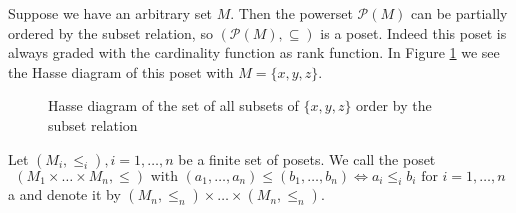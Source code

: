 \begin{exam}
	Suppose we have an arbitrary set $M$. Then the powerset $\mathcal P (M)$ can be partially ordered by the subset relation, so $(\mathcal P (M), \subseteq)$ is a poset. Indeed this poset is always graded with the cardinality function as rank function. In Figure \ref{fig:poset-xyz-subsets} we see the Hasse diagram of this poset with $M = \{x,y,z\}$.

	\begin{figure}[ht]
		\centering
		
		\caption{Hasse diagram of the set of all subsets of $\{x,y,z\}$ order by the subset relation}
		\label{fig:poset-xyz-subsets}
	\end{figure}
\end{exam}

\begin{defi}
	Let $(M_i, \leq_i), i = 1,\ldots,n$ be a finite set of posets. We call the poset
	$$ (M_1 \times \ldots \times M_n,\leq) \textrm{ with } (a_1,\ldots,a_n) \leq (b_1,\ldots,b_n) \iff a_i \leq_i b_i \textrm{ for } i=1,\ldots,n $$
	a  and denote it by $(M_n, \leq_n) \times \ldots \times (M_n, \leq_n)$.
\end{defi}